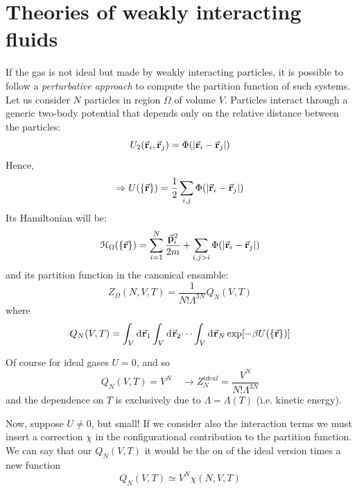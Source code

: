 \documentclass[../../Main/Main.tex]{subfiles}
\begin{document}
\section{Theories of weakly interacting fluids}
If the gas is not ideal but made by weakly interacting particles, it is possible to follow a \emph{perturbative approach}  to compute the partition function of such systems. Let us consider \( N \) particles in region \( \Omega  \) of volume \( V \). Particles interact through a generic two-body potential that depends only on the relative distance between the particles:
\begin{equation*}
  U_2 ( \va{r}_i, \va{r}_j) = \Phi (\abs{\va{r}_i - \va{r}_j} )
\end{equation*}
Hence,
\begin{equation}
  \Rightarrow U ( \{ \va{r} \}  ) = \frac{1}{2} \sum_{i,j}^{} \Phi (\abs{\va{r}_i - \va{r}_j} )
\end{equation}
Its Hamiltonian will be:
\begin{equation}
  \mathcal{H}_ \Omega (\{ \va{r} \}  ) = \sum_{i=1}^{N} \frac{\va{p}_i^2}{2m} + \sum_{i,j>i}^{} \Phi (\abs{\va{r}_i - \va{r}_j} )
\end{equation}
and its partition function in the canonical ensamble:
\begin{equation}
  Z_ \Omega (N,V,T) = \frac{1}{N! \Lambda ^{3N}} Q_N (V,T)
\end{equation}
where
\begin{equation}
  Q_N (V,T) = \int_{V}^{} \dd[]{\va{r}_1} \int_{V}^{} \dd[]{\va{r}_2} \dots \int_{V}^{} \dd[]{\va{r}_N} \exp [- \beta U (\{ \va{r} \}  )]
\end{equation}
\begin{remark}
Of course for ideal gases \( U = 0 \), and so
\begin{equation*}
  Q_N (V,T) = V^N \quad \rightarrow Z_N^{ideal} = \frac{V^N}{N! \Lambda ^{3N}}
\end{equation*}
and the dependence on \( T \) is exclusively due to \( \Lambda = \Lambda (T) \) (i.e. kinetic energy).
\end{remark}
Now, suppose \( U \neq 0 \), but small!
If we consider also the interaction terms we must insert a correction \( \chi  \) in the configurational contribution to the partition function.
 We can say that our \( Q_N (V,T) \) it would be the on of the ideal version times a new function
\begin{equation}
 Q_N (V,T) \simeq V^N \chi (N,V,T)
\end{equation}
\end{document}
